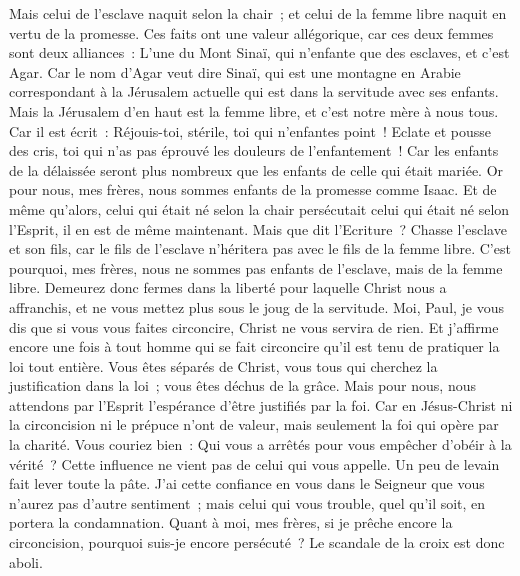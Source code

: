 \begin{multicols}{2}
Mais celui de l'esclave naquit selon la chair~; et celui de la femme libre naquit en vertu de la promesse.
Ces faits ont une valeur allégorique, car ces deux femmes sont deux alliances~: L'une du Mont Sinaï, qui n'enfante que des esclaves, et c'est Agar.
Car le nom d'Agar veut dire Sinaï, qui est une montagne en Arabie correspondant à la Jérusalem actuelle qui est dans la servitude avec ses enfants.
Mais la Jérusalem d'en haut est la femme libre, et c'est notre mère à nous tous.
Car il est écrit~: Réjouis-toi, stérile, toi qui n'enfantes point~! Eclate et pousse des cris, toi qui n'as pas éprouvé les douleurs de l'enfantement~! Car les enfants de la délaissée seront plus nombreux que les enfants de celle qui était mariée.
Or pour nous, mes frères, nous sommes enfants de la promesse comme Isaac.
Et de même qu'alors, celui qui était né selon la chair persécutait celui qui était né selon l'Esprit, il en est de même maintenant.
Mais que dit l'Ecriture~? Chasse l'esclave et son fils, car le fils de l'esclave n'héritera pas avec le fils de la femme libre.
C'est pourquoi, mes frères, nous ne sommes pas enfants de l'esclave, mais de la femme libre.
\VerseOne{}Demeurez donc fermes dans la liberté pour laquelle Christ nous a affranchis, et ne vous mettez plus sous le joug de la servitude.
Moi, Paul, je vous dis que si vous vous faites circoncire, Christ ne vous servira de rien.
Et j'affirme encore une fois à tout homme qui se fait circoncire qu'il est tenu de pratiquer la loi tout entière.
Vous êtes séparés de Christ, vous tous qui cherchez la justification dans la loi~; vous êtes déchus de la grâce.
Mais pour nous, nous attendons par l'Esprit l'espérance d'être justifiés par la foi.
Car en Jésus-Christ ni la circoncision ni le prépuce n'ont de valeur, mais seulement la foi qui opère par la charité.
Vous couriez bien~: Qui vous a arrêtés pour vous empêcher d'obéir à la vérité~?
Cette influence ne vient pas de celui qui vous appelle.
Un peu de levain fait lever toute la pâte.
J'ai cette confiance en vous dans le Seigneur que vous n'aurez pas d'autre sentiment~; mais celui qui vous trouble, quel qu'il soit, en portera la condamnation.
Quant à moi, mes frères, si je prêche encore la circoncision, pourquoi suis-je encore persécuté~? Le scandale de la croix est donc aboli.

\end{multicols}
